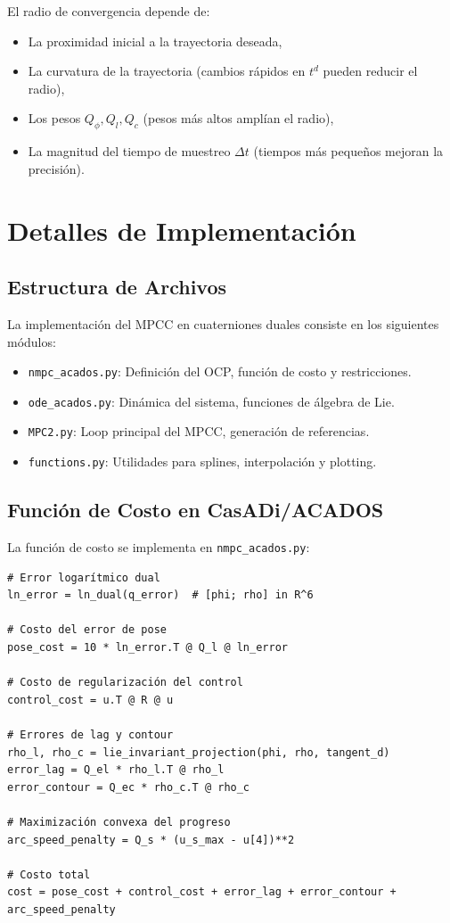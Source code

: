 \documentclass[11pt,a4paper]{article}
\begin{document}
El radio de convergencia depende de:
\begin{itemize}
    \item La proximidad inicial a la trayectoria deseada,
    \item La curvatura de la trayectoria (cambios rápidos en $t^d$ pueden reducir el radio),
    \item Los pesos $Q_\phi, Q_l, Q_c$ (pesos más altos amplían el radio),
    \item La magnitud del tiempo de muestreo $\Delta t$ (tiempos más pequeños mejoran la precisión).
\end{itemize}

\section{Detalles de Implementación}
\label{sec:implementation}

\subsection{Estructura de Archivos}

La implementación del MPCC en cuaterniones duales consiste en los siguientes módulos:

\begin{itemize}
    \item \texttt{nmpc\_acados.py}: Definición del OCP, función de costo y restricciones.
    \item \texttt{ode\_acados.py}: Dinámica del sistema, funciones de álgebra de Lie.
    \item \texttt{MPC2.py}: Loop principal del MPCC, generación de referencias.
    \item \texttt{functions.py}: Utilidades para splines, interpolación y plotting.
\end{itemize}

\subsection{Función de Costo en CasADi/ACADOS}

La función de costo se implementa en \texttt{nmpc\_acados.py}:

\begin{verbatim}
# Error logarítmico dual
ln_error = ln_dual(q_error)  # [phi; rho] in R^6

# Costo del error de pose
pose_cost = 10 * ln_error.T @ Q_l @ ln_error

# Costo de regularización del control
control_cost = u.T @ R @ u

# Errores de lag y contour
rho_l, rho_c = lie_invariant_projection(phi, rho, tangent_d)
error_lag = Q_el * rho_l.T @ rho_l
error_contour = Q_ec * rho_c.T @ rho_c

# Maximización convexa del progreso
arc_speed_penalty = Q_s * (u_s_max - u[4])**2

# Costo total
cost = pose_cost + control_cost + error_lag + error_contour + arc_speed_penalty
\end{verbatim}
\end{document}
